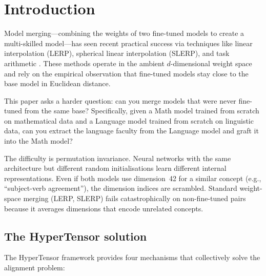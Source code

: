 \documentclass[11pt]{article}
\begin{document}
\section{Introduction}
\label{sec:intro}

Model merging---combining the weights of two fine-tuned models to
create a multi-skilled model---has seen recent practical success via
techniques like linear interpolation (LERP), spherical linear
interpolation (SLERP), and task arithmetic
\cite{ilharco2022editing, wortsman2022task}.  These methods operate in
the ambient $d$-dimensional weight space and rely on the empirical
observation that fine-tuned models stay close to the base model in
Euclidean distance.

This paper asks a harder question: can you merge models that were
never fine-tuned from the same base?  Specifically, given a Math
model trained from scratch on mathematical data and a Language model
trained from scratch on linguistic data, can you extract the language
faculty from the Language model and graft it into the Math model?

The difficulty is permutation invariance.  Neural networks with the same
architecture but different random initialisations learn different
internal representations.  Even if both models use dimension~42 for a
similar concept (e.g., ``subject-verb agreement''), the dimension
indices are scrambled.  Standard weight-space merging (LERP, SLERP)
fails catastrophically on non-fine-tuned pairs because it averages
dimensions that encode unrelated concepts.

\subsection{The HyperTensor solution}

The HyperTensor framework provides four mechanisms that collectively
solve the alignment problem:
\end{document}
